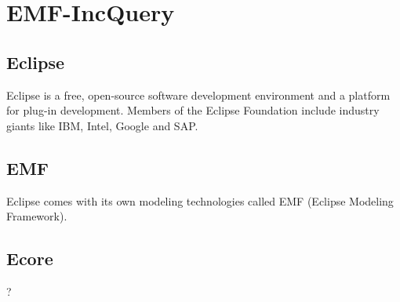 

\section{EMF-IncQuery}




\subsection{Eclipse}

Eclipse is a free, open-source software development environment and a platform for plug-in development. Members of the Eclipse Foundation include industry giants like IBM, Intel, Google and SAP.

\subsection{EMF}

Eclipse comes with its own modeling technologies called EMF (Eclipse Modeling Framework).

\subsection{Ecore}

?

